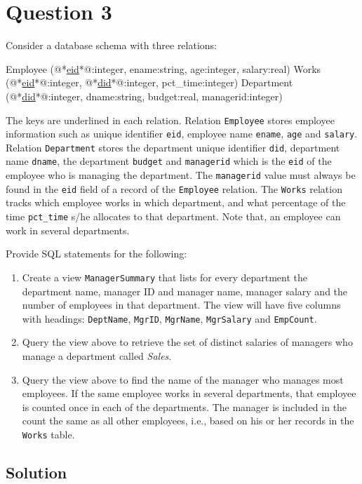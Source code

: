
\section*{Question 3}

Consider a database schema with three relations:\\

\begin{terminal}
Employee (@*\underline{eid}*@:integer, ename:string, age:integer, salary:real)
Works (@*\underline{eid}*@:integer, @*\underline{did}*@:integer, pct\_time:integer)
Department (@*\underline{did}*@:integer, dname:string, budget:real, managerid:integer)
\end{terminal}

The keys are underlined in each relation. Relation \texttt{Employee} stores employee information such as unique identifier \texttt{eid}, employee name \texttt{ename}, \texttt{age} and \texttt{salary}. Relation \texttt{Department} stores the department unique identifier \texttt{did}, department name \texttt{dname}, the department \texttt{budget} and \texttt{managerid} which is the \texttt{eid} of the employee who is managing the department. The \texttt{managerid} value must always be found in the \texttt{eid} field of a record of the \texttt{Employee} relation. The \texttt{Works} relation tracks which employee works in which department, and what percentage of the time \texttt{pct\_time} s/he allocates to that department. Note that, an employee can work in several departments.

Provide SQL statements for the following:

\begin{enumerate}

\item
Create a view \texttt{ManagerSummary} that lists for every department the department name, manager ID and manager name, manager salary and the number of employees in that department. The view will have five columns with headings: \texttt{DeptName}, \texttt{MgrID}, \texttt{MgrName}, \texttt{MgrSalary} and \texttt{EmpCount}.

\item
Query the view above to retrieve the set of distinct salaries of managers who manage a department called \textit{Sales}.

\item
Query the view above to find the name of the manager  who manages most employees. If the same employee works in several departments, that employee is counted once in each  of the departments. The manager is included in the count the same as all other employees, i.e., based on his or her records in the \texttt{Works} table.

\end{enumerate}

\subsection*{Solution}

\lstset{language=sql}

